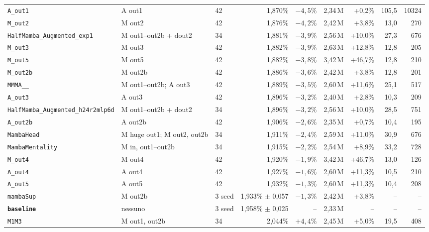 \documentclass[11pt,a4paper]{article}
\newcommand{\cfg}[1]{\texttt{#1}}
\begin{document}
\begin{table}[h!]
{\begin{tabular}{@{}lllrrrrrr@{}}
\cfg{A\_out1} & A out1 & 42 & 1,870\% & $-4{,}5\%$ & 2,34\,M & +0,2\% & 105,5 & 10324 \\
\cfg{M\_out2} & M out2 & 42 & 1,876\% & $-4{,}2\%$ & 2,42\,M & +3,8\% & 13,0 & 270 \\
\cfg{HalfMamba\_Augmented\_exp1} & M out1--out2b + dout2 & 34 & 1,881\% & $-3{,}9\%$ & 2,56\,M & +10,0\% & 27,3 & 676 \\
\cfg{M\_out3} & M out3 & 42 & 1,882\% & $-3{,}9\%$ & 2,63\,M & +12,8\% & 12,8 & 205 \\
\cfg{M\_out5} & M out5 & 42 & 1,882\% & $-3{,}8\%$ & 3,42\,M & +46,7\% & 12,8 & 210 \\
\cfg{M\_out2b} & M out2b & 42 & 1,886\% & $-3{,}6\%$ & 2,42\,M & +3,8\% & 12,8 & 201 \\
\cfg{MMMA\_\_} & M out1--out2b; A out3 & 42 & 1,889\% & $-3{,}5\%$ & 2,60\,M & +11,6\% & 25,1 & 517 \\
\cfg{A\_out3} & A out3 & 42 & 1,896\% & $-3{,}2\%$ & 2,40\,M & +2,8\% & 10,3 & 209 \\
\cfg{HalfMamba\_Augmented\_h24r2mlp6d} & M out1--out2b + dout2 & 34 & 1,896\% & $-3{,}2\%$ & 2,56\,M & +10,0\% & 28,5 & 751 \\
\cfg{A\_out2b} & A out2b & 42 & 1,906\% & $-2{,}6\%$ & 2,35\,M & +0,7\% & 10,4 & 195 \\
\cfg{MambaHead} & M huge out1; M out2, out2b & 34 & 1,911\% & $-2{,}4\%$ & 2,59\,M & +11,0\% & 30,9 & 676 \\
\cfg{MambaMentality} & M in, out1--out2b & 34 & 1,915\% & $-2{,}2\%$ & 2,54\,M & +8,9\% & 33,2 & 728 \\
\cfg{M\_out4} & M out4 & 42 & 1,920\% & $-1{,}9\%$ & 3,42\,M & +46,7\% & 13,0 & 126 \\
\cfg{A\_out4} & A out4 & 42 & 1,927\% & $-1{,}6\%$ & 2,60\,M & +11,3\% & 10,5 & 210 \\
\cfg{A\_out5} & A out5 & 42 & 1,932\% & $-1{,}3\%$ & 2,60\,M & +11,3\% & 10,4 & 208 \\
\cfg{mambaSup} & M out2b & 3 seed & 1,933\% $\pm$ 0,057 & $-1{,}3\%$ & 2,42\,M & +3,8\% & -- & -- \\
\textbf{\cfg{baseline}} & nessuno & 3 seed & 1,958\% $\pm$ 0,025 & -- & 2,33\,M & -- & -- & -- \\
\cfg{M1M3} & M out1, out2b & 34 & 2,044\% & $+4{,}4\%$ & 2,45\,M & +5,0\% & 19,5 & 408 \\
\bottomrule
\end{tabular}}
\end{table}
\end{document}
